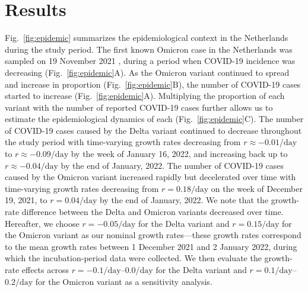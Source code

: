 \documentclass[12pt]{article}
\newcommand{\fref}[1]{Fig.~\ref{fig:#1}}
\begin{document}
\section{Results}

\fref{epidemic} summarizes the epidemiological context in the Netherlands during the study period.
The first known Omicron case in the Netherlands was sampled on 19 November 2021 \citep{backer2021omicron}, during a period when COVID-19 incidence was decreasing (\fref{epidemic}A).
As the Omicron variant continued to spread and increase in proportion (\fref{epidemic}B), the number of COVID-19 cases started to increase (\fref{epidemic}A).
Multiplying the proportion of each variant with the number of reported COVID-19 cases further allows us to estimate the epidemiological dynamics of each (\fref{epidemic}C).
The number of COVID-19 cases caused by the Delta variant continued to decrease throughout the study period with time-varying growth rates decreasing from $r \approx -0.01/\mathrm{day}$ to $r \approx -0.09/\mathrm{day}$ by the week of January 16, 2022, and increasing back up to $r \approx -0.04/\mathrm{day}$ by the end of January, 2022.
The number of COVID-19 cases caused by the Omicron variant increased rapidly but decelerated over time with time-varying growth rates decreasing from $r=0.18/\mathrm{day}$ on the week of December 19, 2021, to $r=0.04/\mathrm{day}$ by the end of January, 2022.
We note that the growth-rate difference between the Delta and Omicron variants decreased over time.
Hereafter, we choose $r=-0.05/\mathrm{day}$ for the Delta variant and $r=0.15/\mathrm{day}$ for the Omicron variant as our nominal growth rates---these growth rates correspond to the mean growth rates between 1 December 2021 and 2 January 2022, during which the incubation-period data were collected.
We then evaluate the growth-rate effects across $r=-0.1/\mathrm{day}$--$0.0/\mathrm{day}$ for the Delta variant and $r=0.1/\mathrm{day}$--$0.2/\mathrm{day}$ for the Omicron variant as a sensitivity analysis.
\end{document}

